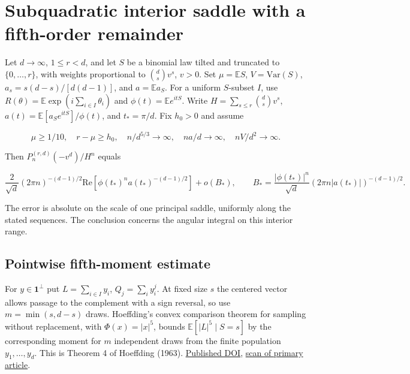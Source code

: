 \section{Subquadratic interior saddle with a fifth-order remainder}\label{sec:subquadratic-interior-saddle}

Let $d\to\infty$, $1\le r<d$, and let $S$ be a binomial law tilted and truncated to $\{0,\ldots,r\}$, with weights proportional to $\binom ds v^s$, $v>0$. Set $\mu=\mathbb ES$, $V=\mathrm{Var}(S)$, $a_s=s(d-s)/[d(d-1)]$, and $a=\mathbb E a_S$. For a uniform $S$-subset $I$, use $R(\theta)=\mathbb E\exp(i\sum_{i\in I}\theta_i)$ and $\phi(t)=\mathbb E e^{itS}$. Write $H=\sum_{s\le r}\binom ds v^s$, $a(t)=\mathbb E[a_S e^{itS}]/\phi(t)$, and $t_*=\pi/d$. Fix $h_0>0$ and assume

\begin{equation*}
\mu\ge1/10,\quad r-\mu\ge h_0,\quad
n/d^{5/3}\to\infty,\quad na/d\to\infty,\quad nV/d^2\to\infty.
\end{equation*}

Then $P_n^{(r,d)}(-v^d)/H^n$ equals

\begin{equation*}
\frac{2}{\sqrt d}(2\pi n)^{-(d-1)/2}\mathrm{Re}\!\left[\phi(t_*)^n a(t_*)^{-(d-1)/2}\right]+o(B_*),
\qquad B_*=\frac{|\phi(t_*)|^n}{\sqrt d}(2\pi n|a(t_*)|)^{-(d-1)/2}.
\end{equation*}

The error is absolute on the scale of one principal saddle, uniformly along the stated sequences. The conclusion concerns the angular integral on this interior range.

\subsection{Pointwise fifth-moment estimate}

For $y\in\mathbf1^\perp$ put $L=\sum_{i\in I}y_i$, $Q_j=\sum_i y_i^j$. At fixed size $s$ the centered vector allows passage to the complement with a sign reversal, so use $m=\min(s,d-s)$ draws. Hoeffding's convex comparison theorem for sampling without replacement, with $\Phi(x)=|x|^5$, bounds $\mathbb E[|L|^5\mid S=s]$ by the corresponding moment for $m$ independent draws from the finite population $y_1,\ldots,y_d$. This is Theorem 4 of Hoeffding (1963). \href{https://doi.org/10.1080/01621459.1963.10500830}{Published DOI}, \href{https://www.cs.rpi.edu/academics/courses/spring06/random/hoefding.pdf}{scan of primary article}.

